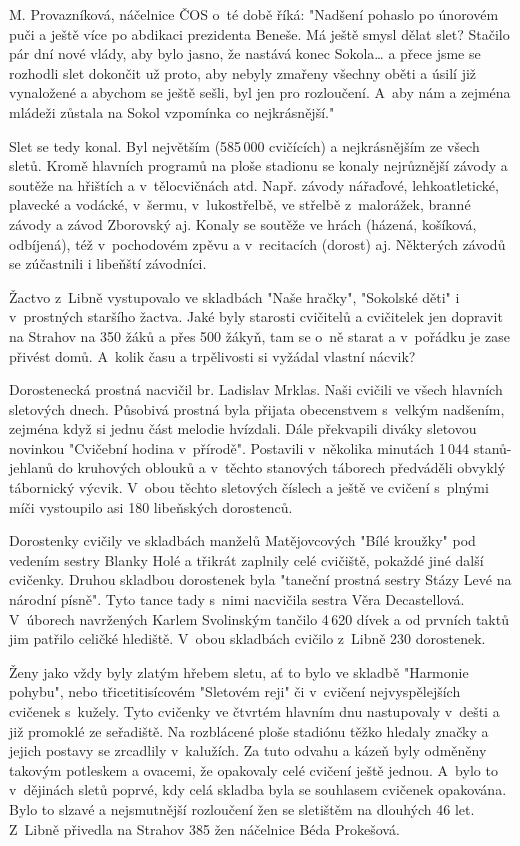 \documentclass[a5paper, 11pt, twoside]{article}
\begin{document}
M. Provazníková, náčelnice ČOS o~té době říká: "Nadšení pohaslo po
únorovém puči a ještě více po abdikaci prezidenta Beneše. Má ještě smysl
dělat slet? Stačilo pár dní nové vlády, aby bylo jasno, že nastává konec
Sokola\ldots{} a přece jsme se rozhodli slet dokončit už proto, aby nebyly
zmařeny všechny oběti a úsilí již vynaložené a abychom se ještě sešli,
byl jen pro rozloučení. A~aby nám a zejména mládeži zůstala na Sokol
vzpomínka co nejkrásnější."

Slet se tedy konal. Byl největším (585\,000 cvičících) a nejkrásnějším ze
všech sletů. Kromě hlavních programů na ploše stadionu se konaly
nejrůznější závody a soutěže na hřištích a v~tělocvičnách atd. Např.
závody nářaďové, lehkoatletické, plavecké a vodácké, v~šermu,
v~lukostřelbě, ve střelbě z~malorážek, branné závody a závod Zborovský aj.
Konaly se soutěže ve hrách (házená, košíková, odbíjená), též
v~pochodovém zpěvu a v~recitacích (dorost) aj. Některých závodů se
zúčastnili i libeňští závodníci.

Žactvo z~Libně vystupovalo ve skladbách "Naše hračky", "Sokolské děti"
i v~prostných staršího žactva. Jaké byly starosti cvičitelů a cvičitelek
jen dopravit na Strahov na 350 žáků a přes 500 žákyň, tam se o~ně starat
a v~pořádku je zase přivést domů. A~kolik času a trpělivosti si vyžádal
vlastní nácvik?

Dorostenecká prostná nacvičil br. Ladislav Mrklas. Naši cvičili ve všech
hlavních sletových dnech. Působivá prostná byla přijata obecenstvem
s~velkým nadšením, zejména když si jednu část melodie hvízdali. Dále
překvapili diváky sletovou novinkou "Cvičební hodina v~přírodě".
Postavili v~několika minutách 1\,044 stanů-jehlanů do kruhových oblouků a
v~těchto stanových táborech předváděli obvyklý tábornický výcvik. V~obou
těchto sletových číslech a ještě ve cvičení s~plnými míči vystoupilo asi
180 libeňských dorostenců.

Dorostenky cvičily ve skladbách manželů Matějovcových "Bílé kroužky"
pod vedením sestry Blanky Holé a třikrát zaplnily celé cvičiště, pokaždé
jiné další cvičenky. Druhou skladbou dorostenek byla "taneční prostná
sestry Stázy Levé na národní písně". Tyto tance tady s~nimi nacvičila
sestra Věra Decastellová. V~úborech navržených Karlem Svolinským tančilo
4\,620 dívek a od prvních taktů jim patřilo celičké hlediště. V~obou
skladbách cvičilo z~Libně 230 dorostenek.

Ženy jako vždy byly zlatým hřebem sletu, ať to bylo ve
skladbě "Harmonie pohybu", nebo třicetitisícovém "Sletovém reji" či
v~cvičení nejvyspělejších cvičenek s~kužely. Tyto cvičenky ve čtvrtém
hlavním dnu nastupovaly v~dešti a již promoklé ze seřadiště. Na
rozblácené ploše stadiónu těžko hledaly značky a jejich postavy se
zrcadlily v~kalužích. Za tuto odvahu a kázeň byly odměněny takovým
potleskem a ovacemi, že opakovaly celé cvičení ještě jednou. A~bylo to
v~dějinách sletů poprvé, kdy celá skladba byla se souhlasem cvičenek
opakována. Bylo to slzavé a nejsmutnější rozloučení žen se sletištěm na
dlouhých 46 let. Z~Libně přivedla na Strahov 385 žen náčelnice Béda
Prokešová.
\end{document}
